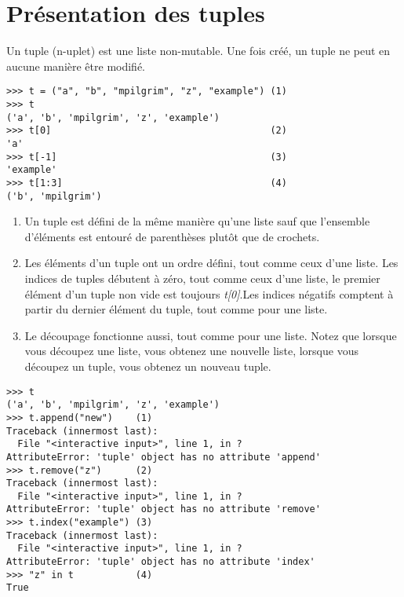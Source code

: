 \section{Présentation des tuples}

Un tuple (n-uplet) est une liste non-mutable. Une fois créé, un tuple ne peut en
aucune manière être modifié.

\begin{example}
\begin{lstlisting}
>>> t = ("a", "b", "mpilgrim", "z", "example") (1)
>>> t
('a', 'b', 'mpilgrim', 'z', 'example')
>>> t[0]                                       (2)
'a'
>>> t[-1]                                      (3)
'example'
>>> t[1:3]                                     (4)
('b', 'mpilgrim')
\end{lstlisting}
\end{example}

\begin{enumerate}
\item{Un tuple est défini de la même manière qu'une liste sauf que l'ensemble d'éléments est entouré de parenthèses plutôt que de crochets.}
\item{Les éléments d'un tuple ont un ordre défini, tout comme ceux d'une liste.  Les indices de tuples débutent à zéro, tout comme ceux d'une liste, le  premier élément d'un tuple non vide est toujours \emph{t[0]}.Les indices négatifs comptent à partir du dernier élément du tuple, tout  comme pour une liste.}
\item{Le découpage fonctionne aussi, tout comme pour une liste. Notez que lorsque  vous découpez une liste, vous obtenez une nouvelle liste, lorsque vous découpez un tuple, vous obtenez un nouveau tuple.}
\end{enumerate}

\begin{example}
\begin{lstlisting}
>>> t
('a', 'b', 'mpilgrim', 'z', 'example')
>>> t.append("new")    (1)
Traceback (innermost last):
  File "<interactive input>", line 1, in ?
AttributeError: 'tuple' object has no attribute 'append'
>>> t.remove("z")      (2)
Traceback (innermost last):
  File "<interactive input>", line 1, in ?
AttributeError: 'tuple' object has no attribute 'remove'
>>> t.index("example") (3)
Traceback (innermost last):
  File "<interactive input>", line 1, in ?
AttributeError: 'tuple' object has no attribute 'index'
>>> "z" in t           (4)
True
\end{lstlisting}
\end{example}

